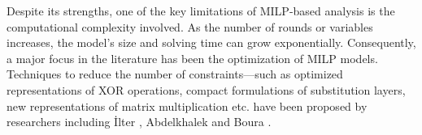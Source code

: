Despite its strengths, one of the key limitations of MILP-based analysis is the computational complexity involved. As the number of rounds or variables increases, the model's size and solving time can grow exponentially. Consequently, a major focus in the literature has been the optimization of MILP models. Techniques to reduce the number of constraints—such as optimized representations of XOR operations, compact formulations of substitution layers, new representations of matrix multiplication etc. have been proposed by researchers including İlter \cite{ilter2024milp}, Abdelkhalek \cite{abdelkhalek2017milp} and Boura \cite{boura2020efficient}.





